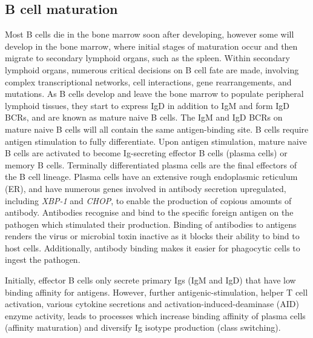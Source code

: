 \subsection{B cell maturation}
Most B cells die in the bone marrow soon after developing, however some will develop in the bone marrow, where initial stages of maturation occur and then migrate to secondary lymphoid organs, such as the spleen.
Within secondary lymphoid organs, numerous critical decisions on B cell fate are made, involving complex transcriptional networks, cell interactions, gene rearrangements, and mutations\cite{roth2014tracking, jourdan2011characterization}.
As B cells develop and leave the bone marrow to populate peripheral lymphoid tissues, they start to express IgD in addition to IgM and form IgD BCRs, and are known as mature naive B cells.
The IgM and IgD BCRs on mature naive B cells will all contain the same antigen-binding site.
B cells require antigen stimulation to fully differentiate.
Upon antigen stimulation, mature naive B cells are activated to become Ig-secreting effector B cells (plasma cells) or memory B cells.
Terminally differentiated plasma cells are the final effectors of the B cell lineage.
Plasma cells have an extensive rough endoplasmic reticulum (ER), and have numerous genes involved in antibody secretion upregulated, including \textit{XBP-1} and \textit{CHOP}\cite{shapiro2004plasma}, to enable the production of copious amounts of antibody.
Antibodies recognise and bind to the specific foreign antigen on the pathogen which stimulated their production.
Binding of antibodies to antigens renders the virus or microbial toxin inactive as it blocks their ability to bind to host cells.
Additionally, antibody binding makes it easier for phagocytic cells to ingest the pathogen.

Initially, effector B cells only secrete primary Igs (IgM and IgD) that have low binding affinity for antigens.
However, further antigenic-stimulation, helper T cell activation, various cytokine secretions and activation-induced-deaminase (AID) enzyme activity, leads to processes which increase binding affinity of plasma cells (affinity maturation) and diversify Ig isotype production (class switching).


